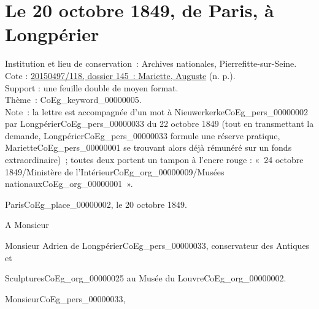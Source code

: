 \documentclass{book}
\begin{document}
\section*{Le 20 octobre 1849, de Paris, à Longpérier}
 \label{labCoEg_Mariette_1849-10-20}
{\footnotesize
\noindent Institution et lieu de conservation~: Archives nationales, Pierrefitte-sur-Seine.\\
Cote : \hyperlink{CoEg_Mariette_ms_001}{20150497/118, dossier 145~: Mariette, Auguste} (n. p.).\\
Support : une feuille double de moyen format.\\
Thème~: \gls{CoEg_keyword_00000005}.\\
Note~: la lettre est accompagnée d’un mot à Nieuwerkerke\gls{CoEg_pers_00000002} par Longpérier\gls{CoEg_pers_00000033} du 22 octobre 1849 (tout en transmettant la demande, Longpérier\gls{CoEg_pers_00000033} formule une réserve pratique, Mariette\gls{CoEg_pers_00000001} se trouvant alors déjà rémunéré sur un fonds extraordinaire)~; toutes deux portent un tampon à l’encre rouge : «~24 octobre 1849/Ministère de l’Intérieur\gls{CoEg_org_00000009}/Musées nationaux\gls{CoEg_org_00000001}~».}
\begin{flushright}
Paris\gls{CoEg_place_00000002}, le 20 octobre 1849.
\end{flushright}
A Monsieur
\begin{center} Monsieur Adrien de Longpérier\gls{CoEg_pers_00000033}, conservateur des Antiques et\end{center}
\begin{flushright}Sculptures\gls{CoEg_org_00000025} au Musée du Louvre\gls{CoEg_org_00000002}.\end{flushright}

\hspace{1cm} Monsieur\gls{CoEg_pers_00000033},\\
\end{document}
